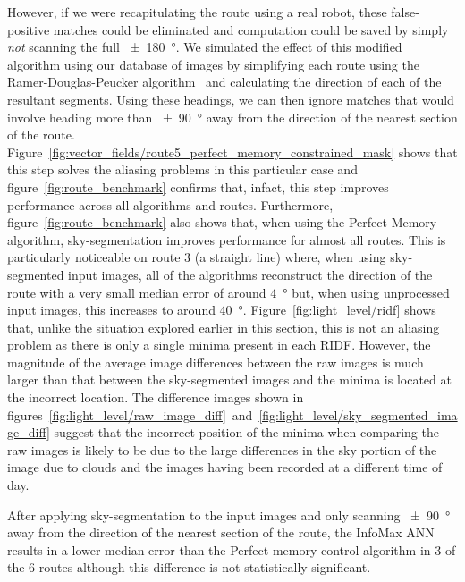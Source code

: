 \documentclass[letterpaper]{article}
\begin{document}
However, if we were recapitulating the route using a real robot, these false-positive matches could be eliminated and computation could be saved by simply \emph{not} scanning the full \SI{\pm 180}{\degree}. 
We simulated the effect of this modified algorithm using our database of images by simplifying each route using the Ramer-Douglas-Peucker algorithm~\citep{Ramer1972} and calculating the direction of each of the resultant segments.
Using these headings, we can then ignore matches that would involve heading more than \SI{\pm 90}{\degree} away from the direction of the nearest section of the route.
Figure~\ref{fig:vector_fields/route5_perfect_memory_constrained_mask} shows that this step solves the aliasing problems in this particular case and figure~\ref{fig:route_benchmark} confirms that, infact, this step improves performance across all algorithms and routes.
Furthermore, figure~\ref{fig:route_benchmark} also shows that, when using the Perfect Memory algorithm, sky-segmentation improves performance for almost all routes.
This is particularly noticeable on route 3 (a straight line) where, when using sky-segmented input images, all of the algorithms reconstruct the direction of the route with a very small median error of around \SI{4}{\degree} but, when using unprocessed input images, this increases to around \SI{40}{\degree}.
Figure~\ref{fig:light_level/ridf} shows that, unlike the situation explored earlier in this section, this is not an aliasing problem as there is only a single minima present in each RIDF.
However, the magnitude of the average image differences between the raw images is much larger than that between the sky-segmented images and the minima is located at the incorrect location.
The difference images shown in figures~\ref{fig:light_level/raw_image_diff}~and~\ref{fig:light_level/sky_segmented_image_diff} suggest that the incorrect position of the minima when comparing the raw images is likely to be due to the large differences in the sky portion of the image due to clouds and the images having been recorded at a different time of day.

After applying sky-segmentation to the input images and only scanning \SI{\pm 90}{\degree} away from the direction of the nearest section of the route, the InfoMax ANN results in a lower median error than the Perfect memory control algorithm in 3 of the 6 routes although this difference is not statistically significant.
\end{document}
